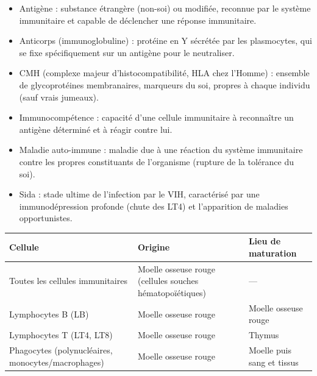 \documentclass[11pt]{article}
\newcommand{\cle}[1]{{\popxbold\color{popdark}#1}}
\newcounter{popsec}
\newcounter{popsub}
\newcommand{\courssub}[1]{%
  \stepcounter{popsub}%
  \par\vspace{9pt}\noindent{\popxbold\fontsize{11.5}{13}\selectfont\color{popink}{\color{poporange}\thepopsec.\thepopsub}\hspace{6pt}#1}\par\nopagebreak\vspace{4pt}
}
\begin{document}
\courssub{L'essentiel à retenir}

\begin{aretenir}
\begin{itemize}
\item \cle{Antigène} : substance étrangère (non-soi) ou modifiée, reconnue par le système immunitaire et capable de déclencher une réponse immunitaire.
\item \cle{Anticorps} (immunoglobuline) : protéine en Y sécrétée par les plasmocytes, qui se fixe spécifiquement sur un antigène pour le neutraliser.
\item \cle{CMH} (complexe majeur d'histocompatibilité, HLA chez l'Homme) : ensemble de glycoprotéines membranaires, marqueurs du \cle{soi}, propres à chaque individu (sauf vrais jumeaux).
\item \cle{Immunocompétence} : capacité d'une cellule immunitaire à reconnaître un antigène déterminé et à réagir contre lui.
\item \cle{Maladie auto-immune} : maladie due à une réaction du système immunitaire contre les propres constituants de l'organisme (rupture de la tolérance du soi).
\item \cle{Sida} : stade ultime de l'infection par le VIH, caractérisé par une immunodépression profonde (chute des LT4) et l'apparition de maladies opportunistes.
\end{itemize}
\end{aretenir}

\begin{aretenir}
\begin{center}
\begin{tabularx}{\linewidth}{|l|X|X|}
\hline
\rowcolor{popblueL} \textbf{Cellule} & \textbf{Origine} & \textbf{Lieu de maturation} \\
\hline
Toutes les cellules immunitaires & Moelle osseuse rouge (cellules souches hématopoïétiques) & --- \\
\hline
Lymphocytes B (LB) & Moelle osseuse rouge & Moelle osseuse rouge \\
\hline
Lymphocytes T (LT4, LT8) & Moelle osseuse rouge & Thymus \\
\hline
Phagocytes (polynucléaires, monocytes/macrophages) & Moelle osseuse rouge & Moelle puis sang et tissus \\
\hline
\end{tabularx}
\end{center}
\end{aretenir}
\end{document}
